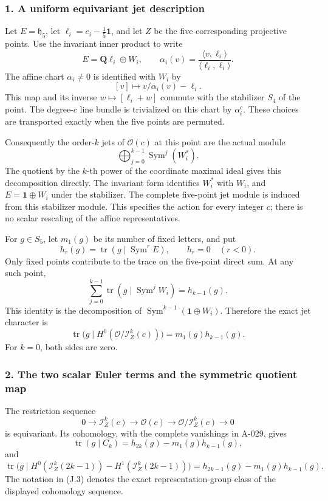 \documentclass[
  10pt,
]{article}
\begin{document}
\subsubsection{1. A uniform equivariant jet
description}\label{a-uniform-equivariant-jet-description}

Let \(E=\mathfrak h_5\), let \(\ell_i=e_i-\frac15\mathbf1\), and let
\(Z\) be the five corresponding projective points. Use the invariant
inner product to write \[
E=\mathbf Q\ell_i\oplus W_i,\qquad
\alpha_i(v)=\frac{\langle v,\ell_i\rangle}{\langle\ell_i,\ell_i\rangle}.
\] The affine chart \(\alpha_i\ne0\) is identified with \(W_i\) by \[
[v]\longmapsto v/\alpha_i(v)-\ell_i.
\] This map and its inverse \(w\mapsto[\ell_i+w]\) commute with the
stabilizer \(S_4\) of the point. The degree-\(c\) line bundle is
trivialized on this chart by \(\alpha_i^c\). These choices are
transported exactly when the five points are permuted.

Consequently the order-\(k\) jets of \(\mathcal O(c)\) at this point are
the actual module \[
\bigoplus_{j=0}^{k-1}\operatorname{Sym}^j(W_i^*).
\] The quotient by the \(k\)-th power of the coordinate maximal ideal
gives this decomposition directly. The invariant form identifies
\(W_i^*\) with \(W_i\), and \(E=\mathbf1\oplus W_i\) under the
stabilizer. The complete five-point jet module is induced from this
stabilizer module. This specifies the action for every integer \(c\);
there is no scalar rescaling of the affine representatives.

For \(g\in S_5\), let \(m_1(g)\) be its number of fixed letters, and put
\[
h_r(g)=\operatorname{tr}(g\mid\operatorname{Sym}^rE),\qquad h_r=0\quad(r<0).
\] Only fixed points contribute to the trace on the five-point direct
sum. At any such point, \[
\sum_{j=0}^{k-1}
\operatorname{tr}(g\mid\operatorname{Sym}^jW_i)
=h_{k-1}(g).
\] This identity is the decomposition of
\(\operatorname{Sym}^{k-1}(\mathbf1\oplus W_i)\). Therefore the exact
jet character is \[
\boxed{\operatorname{tr}\bigl(g\mid
H^0(\mathcal O/\mathcal I_Z^k(c))\bigr)
=m_1(g)h_{k-1}(g).}
\tag{J.1}
\] For \(k=0\), both sides are zero.

\subsubsection{2. The two scalar Euler terms and the symmetric quotient
map}\label{the-two-scalar-euler-terms-and-the-symmetric-quotient-map}

The restriction sequence \[
0\longrightarrow\mathcal I_Z^k(c)
\longrightarrow\mathcal O(c)
\longrightarrow\mathcal O/\mathcal I_Z^k(c)
\longrightarrow0
\] is equivariant. Its cohomology, with the complete vanishings in
A-029, gives \[
\operatorname{tr}(g\mid C_k)
=h_{2k}(g)-m_1(g)h_{k-1}(g),
\tag{J.2}
\] and \[
\operatorname{tr}\bigl(g\mid
H^0(\mathcal I_Z^k(2k-1))-H^1(\mathcal I_Z^k(2k-1))\bigr)
=h_{2k-1}(g)-m_1(g)h_{k-1}(g).
\tag{J.3}
\] The notation in (J.3) denotes the exact representation-group class of
the displayed cohomology sequence.
\end{document}
